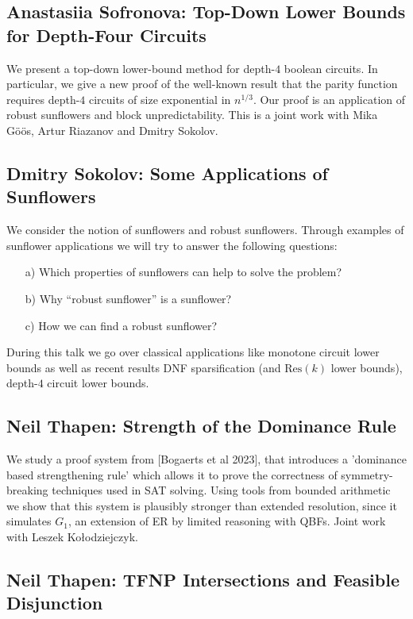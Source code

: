 \documentclass[11pt]{article}
\begin{document}
\subsection*{Anastasiia Sofronova: Top-Down Lower Bounds for Depth-Four Circuits}\label{Sofronova}

We present a top-down lower-bound method for depth-$4$ boolean circuits. In particular, we give a new proof of the well-known result that the parity function requires depth-$4$ circuits of size exponential in $n^{1/3}$. Our proof is an application of robust sunflowers and block unpredictability.
This is a joint work with Mika Göös, Artur Riazanov and Dmitry Sokolov.


\subsection*{Dmitry Sokolov: Some Applications of Sunflowers}\label{Sokolov}

We consider the notion of sunflowers and robust sunflowers. Through examples
of sunflower applications we will try to answer the following questions:
\begin{enumerate}
  \item[a)] Which properties of sunflowers can help to solve the problem?
  \item[b)] Why ``robust sunflower'' is a sunflower?
  \item[c)] How we can find a robust sunflower?
\end{enumerate}
During this talk we go over classical applications like monotone circuit lower bounds
as well as recent results DNF sparsification (and $\mathrm{Res}(k)$ lower bounds),
depth-$4$ circuit lower bounds.

\subsection*{Neil Thapen: Strength of the Dominance Rule}\label{Thapen2}

We study a proof system from [Bogaerts et al 2023], that introduces a 
'dominance based strengthening rule' which allows it to prove the 
correctness of symmetry-breaking techniques used in SAT solving. Using 
tools from bounded arithmetic we show that this system is plausibly 
stronger than extended resolution, since it simulates $G_1$, an extension 
of ER by limited reasoning with QBFs. Joint work with Leszek 
Ko\l odziejczyk.


\subsection*{Neil Thapen: TFNP Intersections and Feasible Disjunction}\label{Thapen1}
\end{document}
